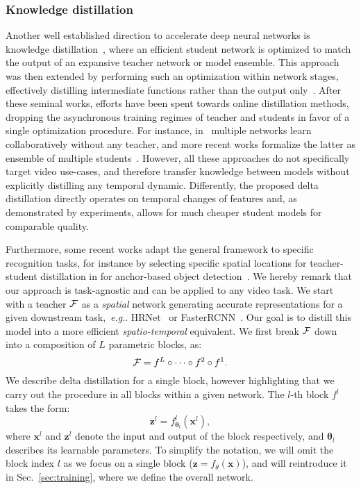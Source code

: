 \documentclass[runningheads]{llncs}
\makeatletter
\def\x{\mathbf{x}}
\def\z{\mathbf{z}}
\def\fl{f^l}
\def\thetal{\mathbf{\theta}_l}
\DeclareRobustCommand\onedot{\futurelet\@let@token\@onedot}
\def\@onedot{\ifx\@let@token.\else.\null\fi\xspace}
\def\eg{\emph{e.g}\onedot} \def\Eg{\emph{E.g}\onedot}
\makeatother
\begin{document}
\subsubsection{Knowledge distillation}
Another well established direction to accelerate deep neural networks is knowledge distillation~\cite{hinton}, where an efficient student network is optimized to match the output of an expansive teacher network or model ensemble.
This approach was then extended by performing such an optimization within network stages, effectively distilling intermediate functions rather than the output only~\cite{fitnets}.
After these seminal works, efforts have been spent towards online distillation methods, dropping the asynchronous training regimes of teacher and students in favor of a single optimization procedure.
For instance, in~\cite{zhang2018deep} multiple networks learn collaboratively without any teacher, and more recent works formalize the latter as ensemble of multiple students~\cite{zhu2018knowledge,guo2020online,wu2021peer}.
However, all these approaches do not specifically target video use-cases, and therefore transfer knowledge between models without explicitly distilling any temporal dynamic.
Differently, the proposed delta distillation directly operates on temporal changes of features and, as demonstrated by experiments, allows for much cheaper student models for comparable quality.

Furthermore, some recent works adapt the general framework to specific recognition tasks, for instance by selecting specific spatial locations for teacher-student distillation in for anchor-based object detection~\cite{dai2021general,fgfi}.
We hereby remark that our approach is task-agnostic and can be applied to any video task.
\label{sec:method}
We start with a teacher $\mathcal{F}$ as a \emph{spatial} network generating accurate representations for a given downstream task,~\eg HRNet~\cite{hrnet} or FasterRCNN~\cite{fasterrcnn}. Our goal is to distill this model into a more efficient \emph{spatio-temporal} equivalent. We first break $\mathcal{F}$ down into a composition of $L$ parametric blocks, as:
\begin{equation*}
\label{eq:sequential_architecture}
\mathcal{F} = f^L\circ \dots \circ f^2 \circ f^1.
\end{equation*}
We describe delta distillation for a single block, however highlighting that we carry out the procedure in all blocks within a given network.
The $l$-th block $\fl$ takes the form:
\begin{equation*}
\z^l = f^l_{\thetal}(\x^{l}),
\end{equation*}
where $\x^{l}$ and $\z^l$ denote the input and output of the block respectively, and $\thetal$ describes its learnable parameters. To simplify the notation, we will omit the block index $l$ as we focus on a single block ($\z = f_{\theta}(\x)$), and will reintroduce it in Sec.~\ref{sec:training}, where we define the overall network.
\end{document}
